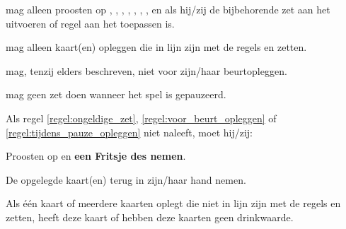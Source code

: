 
\vervolgLijst{}
    \item \EenSpeler mag alleen proosten op , , , , , , ,  en  als hij/zij de bijbehorende zet aan het uitvoeren of regel aan het toepassen is\footnotemark[2]. 
\eindLijst{}


\vervolgLijst{}
    \item \EenSpeler mag alleen kaart(en) opleggen die in lijn zijn met de regels en zetten.
    \label{regel:ongeldige_zet}
\eindLijst{}

\vervolgLijst{}
    \item \EenSpeler mag, tenzij elders beschreven, niet voor zijn/haar beurt\footnotemark[3] opleggen.
    \label{regel:voor_beurt_opleggen}
\eindLijst{}

\vervolgLijst{}
    \item \EenSpeler mag geen zet doen wanneer het spel is gepauzeerd\footnotemark[4].
    \label{regel:tijdens_pauze_opleggen}
\eindLijst{}

\vervolgLijst{}
    \item Als \eenSpeler regel \ref{regel:ongeldige_zet}, \ref{regel:voor_beurt_opleggen} of \ref{regel:tijdens_pauze_opleggen} niet naleeft, moet hij/zij:
    \puntLijst{}
        \item Proosten op  en \textbf{een Fritsje des nemen}\footnotemark[1].
        \item De opgelegde kaart(en) terug in zijn/haar hand nemen.
    \eindPuntLijst{}
    \label{regel:kaarten_terugnemen_2}
\eindLijst{}

\vervolgLijst{}
    \item Als \eenSpeler één kaart of meerdere kaarten oplegt die niet in lijn zijn met de regels en zetten, heeft deze kaart of hebben deze kaarten geen drinkwaarde.
\eindLijst{}  



